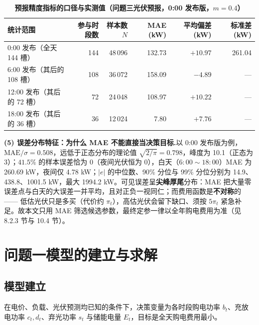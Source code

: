 \documentclass{cumcmthesis}
\begin{document}
\begin{table}[htbp]
\centering
\caption{\textbf{预报精度指标的口径与实测值（问题三光伏预报，0:00 发布版，$m=0.4$）}}
\label{tab:mae_def}
\small
\begin{tabular}{|l|r|r|r|r|r|}
\hline
统计范围 & 参与时段数 & 样本数 $N$ & MAE (kW) & 平均偏差 (kW) & 标准差 (kW) \\
\hline
0:00 发布（全天 144 槽） & 144 & 48\,096 & 132.73 & $+10.97$ & 261.04 \\
\hline
6:00 发布（其后的 108 槽） & 108 & 36\,072 & 158.09 & $-4.89$ & --- \\
\hline
12:00 发布（其后的 72 槽） & 72 & 24\,048 & 108.97 & $+10.22$ & --- \\
\hline
18:00 发布（其后的 36 槽） & 36 & 12\,024 & 7.80 & $+7.76$ & --- \\
\hline
\end{tabular}
\end{table}

\noindent\textbf{(5) 误差分布特征：为什么 MAE 不能直接当决策目标.}以 0:00 发布版为例，$\mathrm{MAE}/\sigma=0.508$，远低于正态分布的理论值 $\sqrt{2/\pi}=0.798$，峰度为 10.1（正态为 3）；$41.5\%$ 的样本误差恰为 $0$（夜间光伏恒为 0），白天（$6{:}00\sim18{:}00$）MAE 为 260.69 kW，夜间仅 4.78 kW；$|e|$ 的中位数、90\% 分位与 99\% 分位分别为 14.9、438.8、1001.5 kW，最大 1994.2 kW。可见误差呈\textbf{尖峰厚尾}分布：MAE 把大量零误差点与白天的大误差一并平均，且对正负一视同仁；而费用函数是\textbf{不对称}的 —— 低估光伏只是多买（代价约 $\pi_t$），高估光伏会留下缺口、须按 $5\pi_t$ 紧急补足。故本文只用 MAE 筛选候选参数，最终定参一律以全年购电费用为准（见 8.2.3 节与 10.4 节）。

\section{问题一模型的建立与求解}
\subsection{模型建立}
在电价、负载、光伏预测均已知的条件下，决策变量为各时段购电功率 $b_t$、充放电功率 $c_t,d_t$、弃光功率 $s_t$ 与储能电量 $E_t$，目标是全天购电费用最小。
\end{document}
